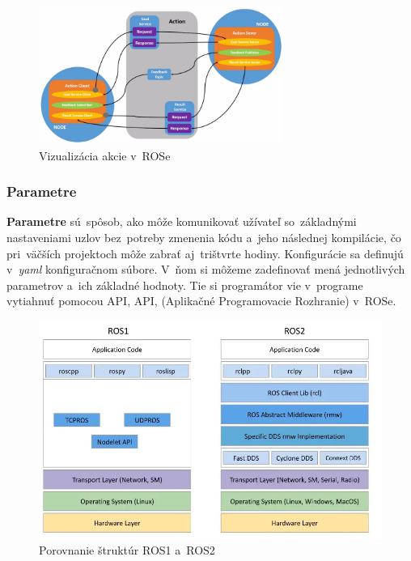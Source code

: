 	\begin{figure}[h]
		\centering
		\includegraphics[width=8cm]{img/actionExplanation.png}
		\caption{Vizualizácia akcie v~ROSe~\cite{RosDoc}}
		\label{fig:action}
	\end{figure}

\subsubsection{Parametre}
\label{sec:parametre}

\textbf{Parametre} sú~spôsob, ako môže komunikovať užívateľ so~základnými nastaveniami uzlov bez~potreby zmenenia kódu a~jeho
následnej kompilácie, čo pri~väčších projektoch môže zabrať aj~trištvrte hodiny. Konfigurácie sa definujú v~\textit{yaml} konfiguračnom
súbore. V~ňom si môžeme zadefinovať mená jednotlivých parametrov a~ich základné hodnoty. Tie si programátor vie v~programe
vytiahnuť pomocou API, \acrlong{API}, (Aplikačné Programovacie Rozhranie) v~ROSe.

\begin{figure}[!htbp]
	\centering
	\includegraphics[width=15cm]{img/strukturaRos1Ros2.png}
	\caption{Porovnanie štruktúr ROS1 a~ROS2~\cite{comparison}}
	\label{fig:struktury}
\end{figure}


